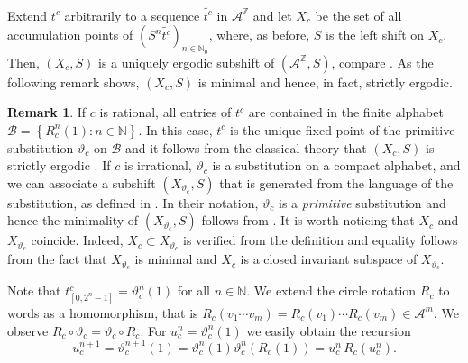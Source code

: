 \documentclass[11pt,reqno]{amsart}
\theoremstyle{plain}
\theoremstyle{definition}
\newtheorem{remark}[theorem]{Remark}
\newcommand{\Z}{{\mathbb Z}}
\newcommand{\N}{{\mathbb N}}
\newcommand{\mc}{\mathcal}
\begin{document}
Extend $t^c$ arbitrarily to a sequence $\widetilde{t^c}$
in $\mc A^{\Z}$ and let $X_{c}$ be the set of all accumulation points of $(S^n \widetilde{t^c})_{n \in \N_0}$, where, as before, $S$ is the left shift on  $X_c$. 
Then, $(X_c,S)$ is a uniquely ergodic subshift of $(\mc A^{\Z},S)$, compare \cite[Cor.~12.2, Ex.~12.1]{queffelec}. As the following remark shows, $(X_{c},S)$ is minimal and hence, in fact, strictly ergodic.
\begin{remark}
If $c$ is rational, all entries of $t^c$ are contained in the finite alphabet $\mc B = \left\{R_c^n(1): n \in \N \right\}$. In this case, $t^c$ is the unique fixed point of the primitive substitution $\vartheta_c$ on $\mc B$ and it follows from the classical theory that $(X_c,S)$ is strictly ergodic \cite{baake}. 
If $c$ is irrational, $\vartheta_c$ is a substitution on a compact alphabet, and we can associate a subshift $(X_{\vartheta_c},S)$ that is generated from the language of the substitution, as defined in \cite{MRW}. In their notation, $\vartheta_c$ is a \emph{primitive} substitution and hence the minimality of $(X_{\vartheta_c},S)$ follows from \cite[Prop.~33]{MRW}. It is worth noticing that $X_c$ and $X_{\vartheta_c}$ coincide. Indeed, $X_c \subset X_{\vartheta_c}$ is verified from the definition and equality follows from the fact that $X_{\vartheta_c}$ is minimal and $X_{c}$ is a closed invariant subspace of $X_{\vartheta_c}$.
\end{remark}

Note that $t^{c}_{[0,2^n-1]} = \vartheta_c^n(1)$ for all $n \in \N$. We extend the circle rotation $R_c$ to words as a homomorphism, that is $R_c(v_1 \cdots v_m) = R_c(v_1) \cdots R_c(v_m) \in \mc A^m$. We observe $R_c \circ \vartheta_c = \vartheta_c \circ R_c$. For $u_c^n = \vartheta_c^n(1)$ we easily obtain the recursion
\begin{equation}
\label{EQ:w_n-recursion}
u_c^{n+1} =  \vartheta_c^{n+1}(1) =  \vartheta_c^n(1) \vartheta_c^n(R_c(1)) = u_c^n \, R_c(u_c^n).
\end{equation}
\end{document}
